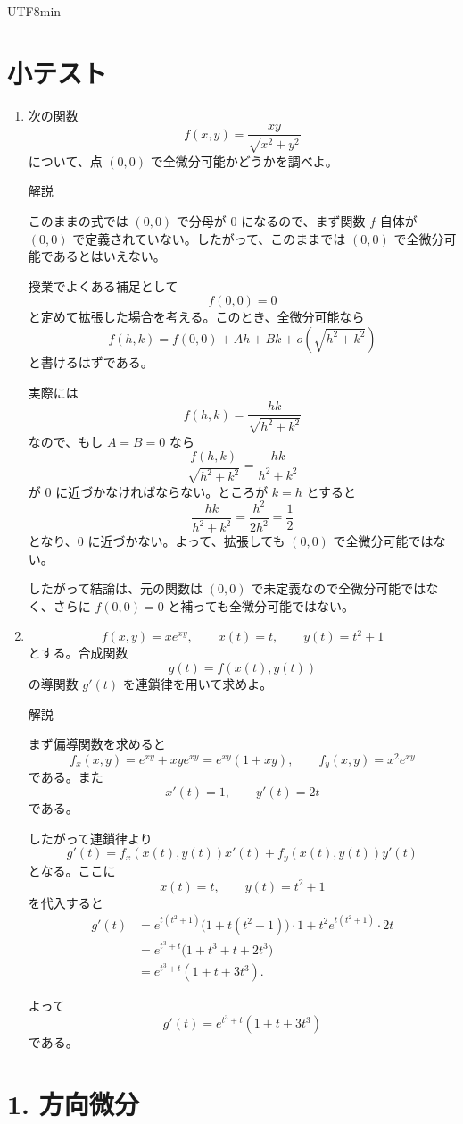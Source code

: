 \documentclass[a4paper,12pt]{article}
\begin{document}
\begin{CJK}{UTF8}{min}
\section*{小テスト}

\begin{enumerate}
\item
次の関数
\[
f(x,y)=\frac{xy}{\sqrt{x^2+y^2}}
\]
について、点 $(0,0)$ で全微分可能かどうかを調べよ。

\medskip
解説\par
このままの式では $(0,0)$ で分母が $0$ になるので、まず関数 $f$ 自体が $(0,0)$ で定義されていない。したがって、このままでは $(0,0)$ で全微分可能であるとはいえない。

授業でよくある補足として
\[
f(0,0)=0
\]
と定めて拡張した場合を考える。このとき、全微分可能なら
\[
f(h,k)=f(0,0)+Ah+Bk+o\left(\sqrt{h^2+k^2}\right)
\]
と書けるはずである。

実際には
\[
f(h,k)=\frac{hk}{\sqrt{h^2+k^2}}
\]
なので、もし $A=B=0$ なら
\[
\frac{f(h,k)}{\sqrt{h^2+k^2}}
=\frac{hk}{h^2+k^2}
\]
が $0$ に近づかなければならない。ところが $k=h$ とすると
\[
\frac{hk}{h^2+k^2}
=\frac{h^2}{2h^2}=\frac12
\]
となり、$0$ に近づかない。よって、拡張しても $(0,0)$ で全微分可能ではない。

したがって結論は、元の関数は $(0,0)$ で未定義なので全微分可能ではなく、さらに $f(0,0)=0$ と補っても全微分可能ではない。

\item
\[
f(x,y)=xe^{xy},\qquad x(t)=t,\qquad y(t)=t^2+1
\]
とする。合成関数
\[
g(t)=f(x(t),y(t))
\]
の導関数 $g'(t)$ を連鎖律を用いて求めよ。

\medskip
解説\par
まず偏導関数を求めると
\[
f_x(x,y)=e^{xy}+xye^{xy}=e^{xy}(1+xy),
\qquad
f_y(x,y)=x^2e^{xy}
\]
である。また
\[
x'(t)=1,\qquad y'(t)=2t
\]
である。

したがって連鎖律より
\[
g'(t)=f_x(x(t),y(t))x'(t)+f_y(x(t),y(t))y'(t)
\]
となる。ここに
\[
x(t)=t,\qquad y(t)=t^2+1
\]
を代入すると
\[
\begin{aligned}
g'(t)
&=e^{t(t^2+1)}\bigl(1+t(t^2+1)\bigr)\cdot1
+t^2e^{t(t^2+1)}\cdot2t\\
&=e^{t^3+t}\bigl(1+t^3+t+2t^3\bigr)\\
&=e^{t^3+t}(1+t+3t^3).
\end{aligned}
\]

よって
\[
\boxed{g'(t)=e^{t^3+t}(1+t+3t^3)}
\]
である。
\end{enumerate}


\section*{1. 方向微分}


\end{CJK}
\end{document}
